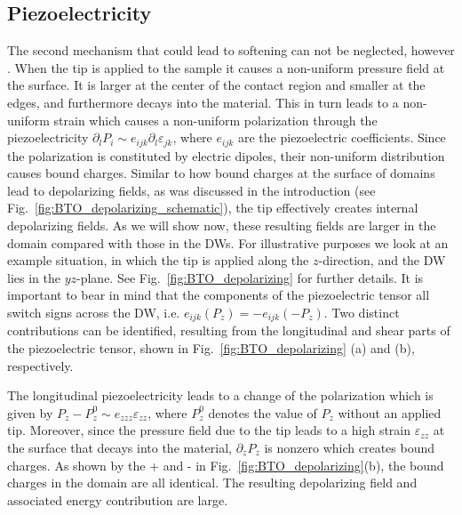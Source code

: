 \subsection{Piezoelectricity}
The second mechanism that could lead to softening can not be neglected, however \cite{Tsuji2005,Stefani2020}.
When the tip is applied to the sample it causes a non-uniform pressure field at the surface.
It is larger at the center of the contact region and smaller at the edges, and furthermore decays into the material.
This in turn leads to a non-uniform strain which causes a non-uniform polarization through the piezoelectricity $\partial_l P_i \sim e_{ijk} \partial_l \varepsilon_{jk}$, where $e_{ijk}$ are the piezoelectric coefficients.
Since the polarization is constituted by electric dipoles, their non-uniform distribution causes bound charges.
Similar to how bound charges at the surface of domains lead to depolarizing fields, as was discussed in the introduction (see Fig.~\ref{fig:BTO_depolarizing_schematic}), the tip effectively creates internal depolarizing fields. 
As we will show now, these resulting fields are larger in the domain compared with those in the DWs.
For illustrative purposes we look at an example situation, in which the tip is applied along the $z$-direction, and the DW lies in the $yz$-plane. See Fig.~\ref{fig:BTO_depolarizing} for further details.
It is important to bear in mind that the components of the piezoelectric tensor all switch signs across the DW, i.e. $e_{ijk}(P_z) = - e_{ijk}(-P_z)$. 
Two distinct contributions can be identified, resulting from the longitudinal and shear parts of the piezoelectric tensor, shown in Fig.~\ref{fig:BTO_depolarizing} (a) and (b), respectively.

The longitudinal piezoelectricity leads to a change of the polarization which is given by $P_z - P^0_z \sim e_{zzz} \varepsilon_{zz}$, where $P^0_z$ denotes the value of $P_z$ without an applied tip.
Moreover, since the pressure field due to the tip leads to a high strain $\varepsilon_{zz}$ at the surface that decays into the material, $\partial_{z} P_z$ is nonzero which creates bound charges.
As shown by the + and - in Fig.~\ref{fig:BTO_depolarizing}(b), the bound charges in the domain are all identical.
The resulting depolarizing field and associated energy contribution are large.

